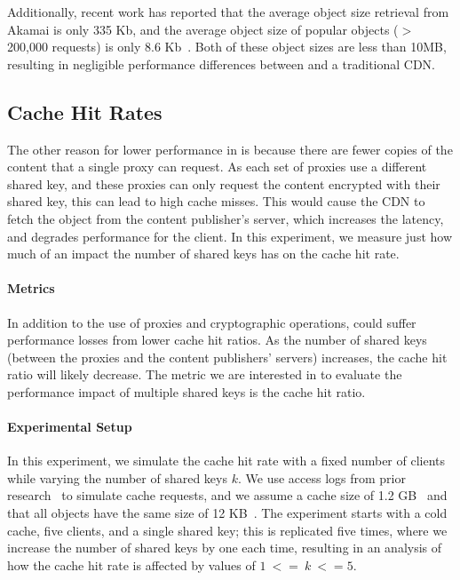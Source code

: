 Additionally, recent work has reported that the average object size retrieval from Akamai is only 335 Kb, and the average object size 
of popular objects ($>$ 200,000 requests) is only 8.6 Kb~\cite{berger2016achieving}.  Both of these object sizes are less than 10MB, resulting in negligible 
performance differences between \system{} and a traditional CDN.

\subsection{Cache Hit Rates}
The other reason for lower performance in \system{} is because there are fewer copies of the content that a single proxy can request.  As each set 
of proxies use a different shared key, and these proxies can only request the content encrypted with their shared key, this can lead to high cache misses.  
This would cause the CDN to fetch the object from the content publisher's server, which increases the latency, and degrades performance for the client.  
In this experiment, we measure just how much of an impact the number of shared keys has on the cache hit rate.\\

\paragraph{Metrics}
In addition to the use of proxies and cryptographic operations, \system{} could suffer performance losses from lower cache hit ratios.  As the number 
of shared keys (between the proxies and the content publishers' servers) increases, the cache hit ratio will likely decrease.  The metric we are interested 
in to evaluate the performance impact of multiple shared keys is the cache hit ratio.\\

\paragraph{Experimental Setup}
In this experiment, we simulate the cache hit rate with a fixed number of clients while varying the number of shared keys $k$.  We use 
access logs from prior research~\cite{andersen2005improving} to simulate cache requests, and we assume a cache size of 1.2 GB~\cite{berger2017adaptsize} and that all objects have 
the same size of 12 KB~\cite{berger2016achieving}.  The experiment starts with a cold cache, five clients, and a single shared key; this is 
replicated five times, where we increase the number of shared keys by one each time, resulting in an analysis of how the cache hit rate is affected 
by values of $1~<=~k~<= 5$.

